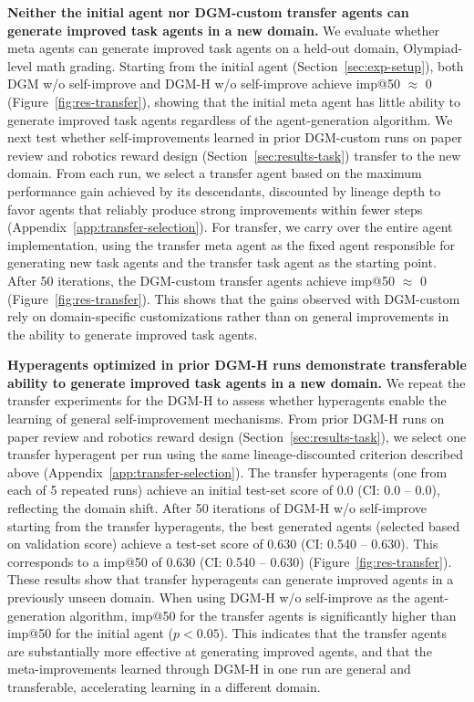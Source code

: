 \textbf{Neither the initial agent nor DGM-custom transfer agents can generate improved task agents in a new domain.}
We evaluate whether meta agents can generate improved task agents on a held-out domain, Olympiad-level math grading. Starting from the initial agent (Section~\ref{sec:exp-setup}), both DGM w/o self-improve and DGM-H w/o self-improve achieve imp@50 $\approx$ 0 (Figure~\ref{fig:res-transfer}), showing that the initial meta agent has little ability to generate improved task agents regardless of the agent-generation algorithm.
We next test whether self-improvements learned in prior DGM-custom runs on paper review and robotics reward design (Section~\ref{sec:results-task}) transfer to the new domain. From each run, we select a transfer agent based on the maximum performance gain achieved by its descendants, discounted by lineage depth to favor agents that reliably produce strong improvements within fewer steps (Appendix~\ref{app:transfer-selection}). For transfer, we carry over the entire agent implementation, using the transfer meta agent as the fixed agent responsible for generating new task agents and the transfer task agent as the starting point.
After 50 iterations, the DGM-custom transfer agents achieve imp@50 $\approx$ 0 (Figure~\ref{fig:res-transfer}). This shows that the gains observed with DGM-custom rely on domain-specific customizations rather than on general improvements in the ability to generate improved task agents.

\textbf{Hyperagents optimized in prior DGM-H runs demonstrate transferable ability to generate improved task agents in a new domain.}
We repeat the transfer experiments for the DGM-H to assess whether hyperagents enable the learning of general self-improvement mechanisms. From prior DGM-H runs on paper review and robotics reward design (Section~\ref{sec:results-task}), we select one transfer hyperagent per run using the same lineage-discounted criterion described above (Appendix~\ref{app:transfer-selection}). The transfer hyperagents (one from each of 5 repeated runs) achieve an initial test-set score of 0.0 (CI: 0.0 -- 0.0), reflecting the domain shift. After 50 iterations of DGM-H w/o self-improve starting from the transfer hyperagents, the best generated agents (selected based on validation score) achieve a test-set score of 0.630 (CI: 0.540 -- 0.630). This corresponds to a imp@50 of 0.630 (CI: 0.540 -- 0.630) (Figure~\ref{fig:res-transfer}). These results show that transfer hyperagents can generate improved agents in a previously unseen domain. When using DGM-H w/o self-improve as the agent-generation algorithm, imp@50 for the transfer agents is significantly higher than imp@50 for the initial agent ($p < 0.05$). This indicates that the transfer agents are substantially more effective at generating improved agents, and that the meta-improvements learned through DGM-H in one run are general and transferable, accelerating learning in a different domain.

